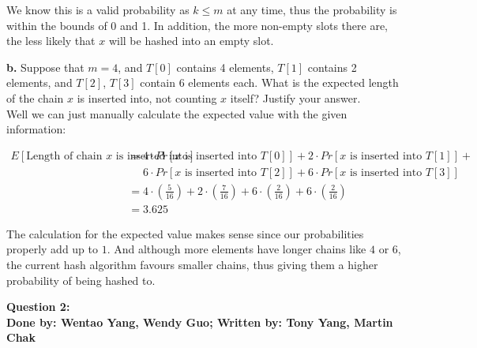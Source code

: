 \documentclass[20pt]{article}
\begin{document}
\noindent
\begin{text}
    We know this is a valid probability as $k \leq m$ at any time, thus the probability is within the bounds of 0 and 1. In addition, the more non-empty slots there are, the less likely that $x$ will be hashed into an empty slot.\\
\end{text}

\noindent
\begin{text}
    \textbf{b.} Suppose that $m = 4$, and $T[0]$ contains 4 elements, $T[1]$ contains 2 elements, and $T[2]$, $T[3]$ contain 6 elements each. What is the expected length of the chain $x$ is inserted into, not counting $x$ itself? Justify your answer.\\
    
    \noindent
    Well we can just manually calculate the expected value with the given information:
\end{text}

\begin{align*}
    E[\text{Length of chain $x$ is inserted into}] &= 4\cdot Pr[\text{$x$ is inserted into $T[0]$}]+
    2\cdot Pr[\text{$x$ is inserted into $T[1]$}]+\\
    &\,\,\,\,\,\,\,\,6\cdot Pr[\text{$x$ is inserted into $T[2]$}]+
    6\cdot Pr[\text{$x$ is inserted into $T[3]$}]\\
    &= 4 \cdot (\frac{5}{16}) + 2 \cdot (\frac{7}{16}) + 6 \cdot (\frac{2}{16}) + 6 \cdot (\frac{2}{16})\\
    &= 3.625
\end{align*}

\noindent
\begin{text}
    The calculation for the expected value makes sense since our probabilities properly add up to $1$. And although more elements have longer chains like $4$ or $6$, the current hash algorithm favours smaller chains, thus giving them a higher probability of being hashed to.
\end{text}


\newpage

\noindent
\textbf{Question 2:}\\
\textbf{Done by: Wentao Yang, Wendy Guo; Written by: Tony Yang, Martin Chak}\\
\end{document}
